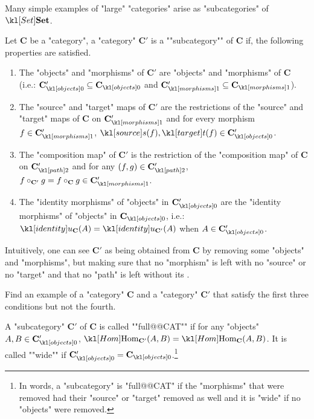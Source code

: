 \documentclass[main.tex]{subfiles}
\begin{document}
Many simple examples of "large" "categories" arise as "subcategories" of $\catSet$.
\begin{defn}[Subcategory]
	\AP Let $\mathbf{C}$ be a "category", a "category" $\mathbf{C}'$ is a ""subcategory"" of $\mathbf{C}$ if, the following properties are satisfied.
	\begin{enumerate}
		\item The "objects" and "morphisms" of $\mathbf{C}'$ are "objects" and "morphisms" of $\mathbf{C}$ (i.e.: $\obj{\mathbf{C}'} \subseteq \obj{\mathbf{C}}$ and $\mor{\mathbf{C}'} \subseteq \mor{\mathbf{C}}$).
		\item The "source" and "target" maps of $\mathbf{C}'$ are the restrictions of the "source" and "target" maps of $\mathbf{C}$ on $\mor{\mathbf{C}'}$ and for every morphism $f \in \mor{\mathbf{C}'}$, $\source(f), \target(f) \in \obj{\mathbf{C}'}$.
		\item The "composition map" of $\mathbf{C}'$ is the restriction of the "composition map" of $\mathbf{C}$ on $\mortwo{\mathbf{C}'}$ and for any $(f,g) \in \mortwo{\mathbf{C}'}$, $f\circ_{\mathbf{C}'} g = f \circ_{\mathbf{C}} g \in \mor{\mathbf{C}'}$.
		\item The "identity morphisms" of "objects" in $\obj{\mathbf{C}'}$ are the "identity morphisms" of "objects" in $\obj{\mathbf{C}}$, i.e.: $\idu_{\mathbf{C}}(A) = \idu_{\mathbf{C}'}(A)$ when $A \in \obj{\mathbf{C}'}$.
	\end{enumerate}
	Intuitively, one can see $\mathbf{C}'$ as being obtained from $\mathbf{C}$ by removing some "objects" and "morphisms", but making sure that no "morphism" is left with no "source" or no "target" and that no "path" is left without its .
\end{defn}
\begin{exer}[\NOW]\label{exer:catfunc:countersubcat}
	Find an example of a "category" $\mathbf{C}$ and a "category" $\mathbf{C}'$ that satisfy the first three conditions but not the fourth.
\end{exer}
\begin{defn}
	\AP A "subcategory" $\mathbf{C}'$ of $\mathbf{C}$ is called ""full@@CAT"" if for any "objects" $A,B \in \obj{\mathbf{C}'}$, $\Hom_{\mathbf{C}'}(A,B) = \Hom_{\mathbf{C}}(A,B)$. \AP It is called ""wide"" if $\obj{\mathbf{C}'} = \obj{\mathbf{C}}$.\footnote{In words, a "subcategory" is "full@@CAT" if the "morphisms" that were removed had their "source" or "target" removed as well and it is "wide" if no "objects" were removed.}
\end{defn}
\end{document}
